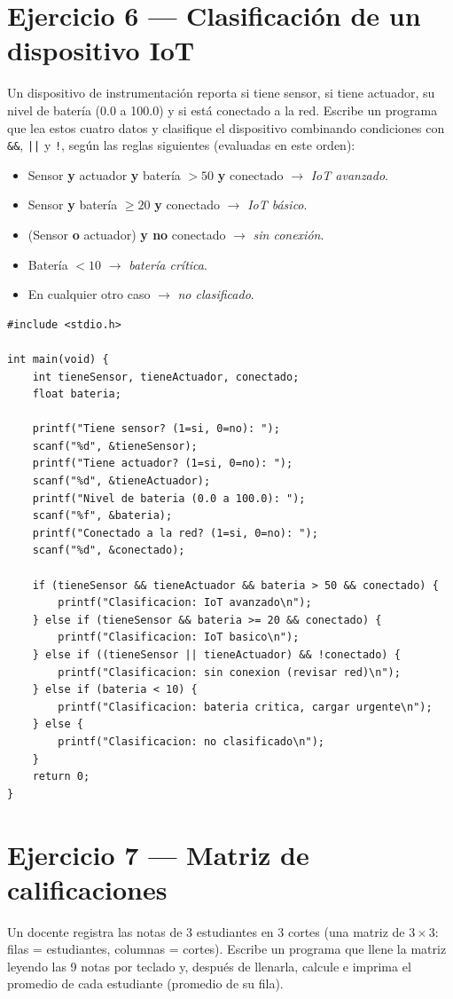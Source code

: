 \documentclass[11pt,letterpaper]{article}
\begin{document}
\section*{Ejercicio 6 --- Clasificación de un dispositivo IoT}
Un dispositivo de instrumentación reporta si tiene sensor, si tiene actuador, su nivel de batería
(0.0 a 100.0) y si está conectado a la red. Escribe un programa que lea estos cuatro datos y
clasifique el dispositivo combinando condiciones con \texttt{\&\&}, \texttt{||} y \texttt{!},
según las reglas siguientes (evaluadas en este orden):
\begin{itemize}[leftmargin=1.2cm]
  \item Sensor \textbf{y} actuador \textbf{y} batería $>50$ \textbf{y} conectado
        $\to$ \emph{IoT avanzado}.
  \item Sensor \textbf{y} batería $\geq 20$ \textbf{y} conectado $\to$ \emph{IoT básico}.
  \item (Sensor \textbf{o} actuador) \textbf{y no} conectado $\to$ \emph{sin conexión}.
  \item Batería $<10$ $\to$ \emph{batería crítica}.
  \item En cualquier otro caso $\to$ \emph{no clasificado}.
\end{itemize}

\begin{lstlisting}
#include <stdio.h>

int main(void) {
    int tieneSensor, tieneActuador, conectado;
    float bateria;

    printf("Tiene sensor? (1=si, 0=no): ");
    scanf("%d", &tieneSensor);
    printf("Tiene actuador? (1=si, 0=no): ");
    scanf("%d", &tieneActuador);
    printf("Nivel de bateria (0.0 a 100.0): ");
    scanf("%f", &bateria);
    printf("Conectado a la red? (1=si, 0=no): ");
    scanf("%d", &conectado);

    if (tieneSensor && tieneActuador && bateria > 50 && conectado) {
        printf("Clasificacion: IoT avanzado\n");
    } else if (tieneSensor && bateria >= 20 && conectado) {
        printf("Clasificacion: IoT basico\n");
    } else if ((tieneSensor || tieneActuador) && !conectado) {
        printf("Clasificacion: sin conexion (revisar red)\n");
    } else if (bateria < 10) {
        printf("Clasificacion: bateria critica, cargar urgente\n");
    } else {
        printf("Clasificacion: no clasificado\n");
    }
    return 0;
}
\end{lstlisting}

\section*{Ejercicio 7 --- Matriz de calificaciones}
Un docente registra las notas de 3 estudiantes en 3 cortes (una matriz de $3\times3$: filas =
estudiantes, columnas = cortes). Escribe un programa que llene la matriz leyendo las 9 notas por
teclado y, después de llenarla, calcule e imprima el promedio de cada estudiante (promedio de su
fila).
\end{document}
